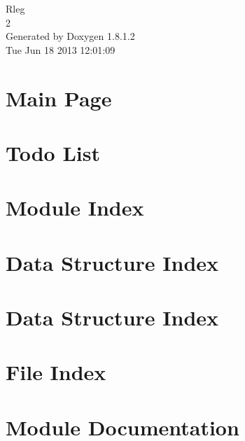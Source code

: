 \documentclass{book}
\begin{document}
\hypersetup{pageanchor=false,citecolor=blue}
\begin{titlepage}
\vspace*{7cm}
\begin{center}
{\Large Rleg \\[1ex]\large 2 }\\
\vspace*{1cm}
{\large Generated by Doxygen 1.8.1.2}\\
\vspace*{0.5cm}
{\small Tue Jun 18 2013 12:01:09}\\
\end{center}
\end{titlepage}
\clearemptydoublepage
{}
\tableofcontents
\clearemptydoublepage
{}
\hypersetup{pageanchor=true,citecolor=blue}
\chapter{Main Page}
\label{index}\hypertarget{index}{}
\chapter{Todo List}
\label{todo}
\hypertarget{todo}{}

\chapter{Module Index}

\chapter{Data Structure Index}

\chapter{Data Structure Index}

\chapter{File Index}

\chapter{Module Documentation}


\end{document}
